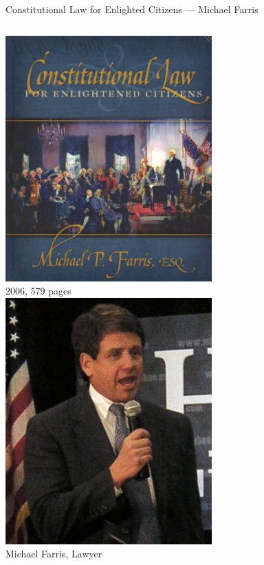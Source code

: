 \documentclass{beamer}
\begin{document}
\begin{frame}{Constitutional Law for Enlighted Citizens --- Michael Farris}
    \begin{columns}[onlytextwidth]
            \centering
            \includegraphics[width=0.75\textwidth]{img/constitutional-law.png} \\
            2006, 579 pages \\

            \centering
            \includegraphics[width=0.75\textwidth]{img/michael-farris.png} \\
            Michael Farris, Lawyer
    \end{columns}
\end{frame}
\end{document}
